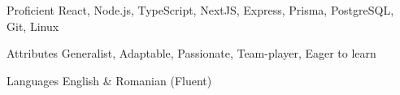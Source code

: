 
\begin{cvskills}

  \cvskill
  {Proficient}
  {React, Node.js, TypeScript, NextJS, Express, Prisma, PostgreSQL, Git, Linux}

  \cvskill
  {Attributes}
  {Generalist, Adaptable, Passionate, Team-player, Eager to learn}

  \cvskill
  {Languages}
  {English \& Romanian (Fluent)}

\end{cvskills}